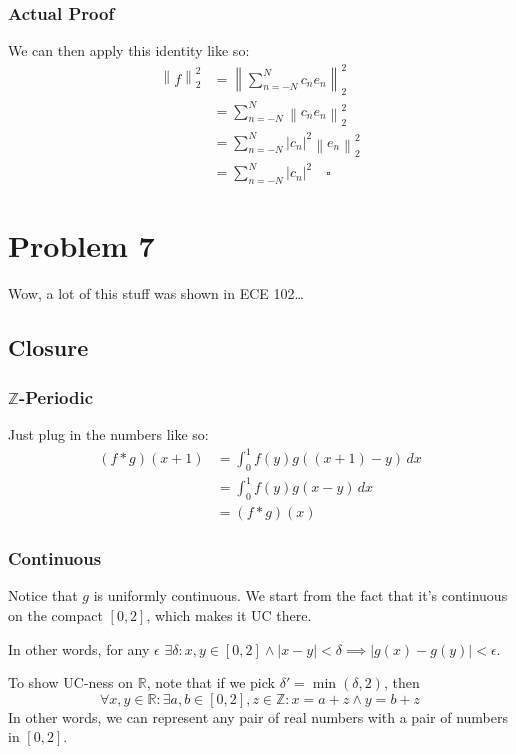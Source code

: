 \documentclass[12pt]{article}
\newcommand{\R}{\mathbb{R}}
\newcommand{\Z}{\mathbb{Z}}
\newcommand{\norm}[1]{\left\lVert#1\right\rVert}
\begin{document}
\subsubsection{Actual Proof}

We can then apply this identity like so:
\begin{align*}
  \norm{f}_2^2
   & = \norm{\sum_{n=-N}^{N} c_ne_n}_2^2     \\
   & = \sum_{n=-N}^{N} \norm{c_ne_n}_2^2     \\
   & = \sum_{n=-N}^{N} |c_n|^2\norm{e_n}_2^2 \\
   & = \sum_{n=-N}^{N} |c_n|^2\quad\square
\end{align*}

\pagebreak

\section{Problem 7}

Wow, a lot of this stuff was shown in ECE 102\dots

\subsection{Closure}

\subsubsection{\texorpdfstring{$\Z$}{Z}-Periodic}

Just plug in the numbers like so:
\begin{align*}
  (f * g)(x+1)
   & = \int_{0}^{1} f(y)g((x+1)-y)\,dx \\
   & = \int_{0}^{1} f(y)g(x-y)\,dx     \\
   & = (f*g)(x)
\end{align*}

\subsubsection{Continuous}

Notice that $g$ is uniformly continuous.
We start from the fact that it's continuous on the compact $[0, 2]$, which makes it UC there.

In other words, for any $\epsilon$
$\exists \delta: x, y \in [0, 2] \land |x-y| < \delta \implies |g(x)-g(y)| < \epsilon$.

To show UC-ness on $\R$, note that if we pick $\delta'=\min(\delta, 2)$, then
\[\forall x, y \in \R: \exists a, b \in [0, 2], z \in \Z: x=a+z \land y=b+z\]
In other words, we can represent any pair of real numbers with
a pair of numbers in $[0, 2]$.
\end{document}
